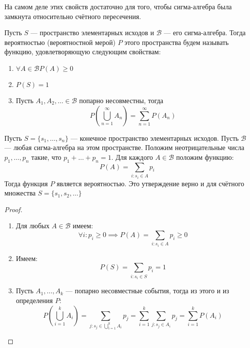 \documentclass[document]{subfiles}
\begin{document}
На самом деле этих свойств достаточно для того, чтобы сигма-алгебра была замкнута относительно счётного пересечения.

\begin{definition}
    Пусть $S$ --- пространство элементарных исходов и $\mathcal{B}$ --- его сигма-алгебра. Тогда вероятностью (вероятностной мерой) $P$ этого пространства будем называть функцию, удовлетворяющую следующим свойствам:
    \begin{enumerate}
        \item $\forall A \in \mathcal{B}P(A) \ge 0$
        \item $P(S) = 1$
        \item Пусть $A_1, A_2, \dots \in \mathcal{B}$ попарно несовместны, тогда $$P(\bigcup_{n=1}^\infty A_n) = \sum_{n=1}^\infty P(A_n)$$
    \end{enumerate}
\end{definition}

\begin{theorem}
    Пусть $S = \{s_1, \dots, s_n\}$ --- конечное пространство элементарных исходов. Пусть $\mathcal{B}$ --- любая сигма-алгебра на этом пространстве. Положим неотрицательные числа $p_1, \dots, p_n$ такие, что $p_1 + \dots + p_n = 1$. Для каждого $A \in \mathcal{B}$ положим функцию:
    \[P(A) = \displaystyle\sum_{i: s_i \in A} p_i\]
    Тогда функция $P$ является вероятностью. Это утверждение верно и для счётного множества $S = \{s_1, s_2, \dots\}$
\end{theorem}
\begin{proof}
    \begin{enumerate}
        \item Для любых $A \in \mathcal{B}$ имеем:
            \[\forall i: p_i \ge 0 \implies P(A) = \sum_{i: s_i \in A} p_i \ge 0\]
        \item Имеем:
            \[P(S) = \sum_{i: s_i \in S} p_i = 1\]
        \item Пусть $A_1, \dots, A_k$ --- попарно несовместные события, тогда из этого и из определения $P$:
            \[P \left( \bigcup_{i=1}^k A_i \right) = \sum_{j: s_j \in \bigcup_{i=1}^k A_i} p_j = \sum_{i=1}^k \sum_{j: s_j \in A_i} p_j= \sum_{i=1}^k P(A_i)\]
    \end{enumerate}
\end{proof}
\end{document}
